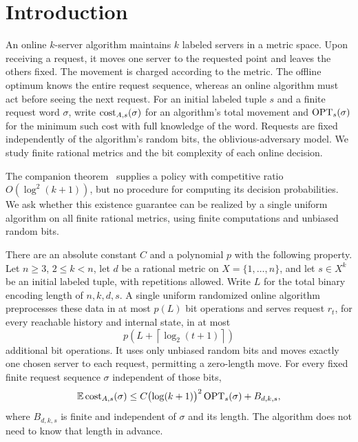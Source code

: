 \section{Introduction}\label{sec:introduction}

An online \(k\)-server algorithm maintains \(k\) labeled servers in a metric
space. Upon receiving a request, it moves one server to the requested point
and leaves the others fixed. The movement is charged according to the metric.
The offline optimum knows the entire request sequence, whereas an online
algorithm must act before seeing the next request. For an initial labeled
tuple \(s\) and a finite request word \(\sigma\), write
\(\operatorname{cost}_{A,s}(\sigma)\) for an algorithm's total movement and
\(\operatorname{OPT}_s(\sigma)\) for the minimum such cost with full knowledge of the word.
Requests are fixed independently of the algorithm's random bits, the
oblivious-adversary model. We study finite rational metrics and the bit
complexity of each online decision.

The companion theorem~\cite{SquaredLog2026} supplies a policy with
competitive ratio \(O(\log^2(k+1))\), but no procedure for computing
its decision probabilities. We ask whether this existence guarantee can
be realized by a single uniform algorithm on all finite rational metrics,
using finite computations and unbiased random bits.

\begin{theorem}\label{thm:main}
There are an absolute constant \(C\) and a polynomial \(p\) with the following
property. Let \(n\ge3\), \(2\le k<n\), let \(d\) be a rational metric on
\(X=\{1,\ldots,n\}\), and let \(s\in X^k\) be an initial labeled tuple,
with repetitions allowed. Write \(L\) for the total binary encoding length
of \(n,k,d,s\). A single uniform randomized online algorithm preprocesses
these data in at most \(p(L)\) bit operations and serves request \(r_t\),
for every reachable history and internal state, in at most
\[
 p\!\left(L+\left\lceil\log_2(t+1)\right\rceil\right)
\]
additional bit operations. It uses only unbiased random bits and moves
exactly one chosen server to each request, permitting a zero-length move.
For every fixed finite request sequence \(\sigma\) independent of those bits,
\begin{equation}\label{eq:main-bound}
 \mathbb E\operatorname{cost}_{A,s}(\sigma)
 \le C\bigl(\log(k+1)\bigr)^2\operatorname{OPT}_s(\sigma)+B_{d,k,s},
\end{equation}
where \(B_{d,k,s}\) is finite and independent of \(\sigma\) and its length.
The algorithm does not need to know that length in advance.
\end{theorem}


